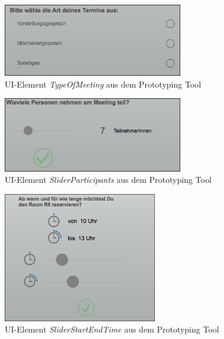 \begin{figure}[!htb]
    \centering
    \vspace{1.5cm}
    \includegraphics[width=0.7\textwidth]{bilder/anhang/UIElementsPrototyping/TypeOfMeeting.png}
    \caption{\acs{UI}-Element \textit{TypeOfMeeting} aus dem Prototyping Tool}
    \label{fig:ui-element-typeofmeeting}
\end{figure}

\begin{figure}[!htb]
    \centering
    \vspace{1.5cm}
    \includegraphics[width=0.7\textwidth]{bilder/anhang/UIElementsPrototyping/SliderParticipants.png}
    \caption{\acs{UI}-Element \textit{SliderParticipants} aus dem Prototyping Tool}
    \label{fig:ui-element-sliderparticipants}
\end{figure}

\begin{figure}[!htb]
    \centering
    \includegraphics[width=0.6\textwidth]{bilder/anhang/UIElementsPrototyping/SliderStartEndTime.png}
    \caption{\acs{UI}-Element \textit{SliderStartEndTime} aus dem Prototyping Tool}
    \label{fig:ui-element-sliderstartendtime}
\end{figure}

